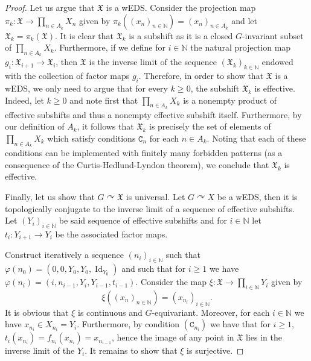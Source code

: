 \documentclass{article}
\theoremstyle{definition}
\theoremstyle{plain}
\newcommand{\NN}{\mathbb{N}}
\begin{document}
\begin{proof}
        Let us argue that $\mathfrak{X}$ is a wEDS. Consider the projection map $\pi_k \colon \mathfrak{X} \to \prod_{n\in A_k} X_n$ given by $\pi_k((x_n)_{n\in \NN}) = (x_n)_{n\in A_k}$ and let $\mathfrak{X}_k = \pi_k(\mathfrak{X})$. It is clear that $\mathfrak{X}_k$ is a subshift as it is a closed $G$-invariant subset of $\prod_{n\in A_k} X_k$. Furthermore, if we define for $i \in \NN$ the natural projection map $g_{i}\colon \mathfrak{X}_{i+1} \to \mathfrak{X}_i$, then $\mathfrak{X}$ is the inverse limit of the sequence $(\mathfrak{X}_k)_{k \in \NN}$ endowed with the collection of factor maps $g_{i}$. Therefore, in order to show that $\mathfrak{X}$ is a wEDS, we only need to argue that for every $k \geq 0$, the subshift $\mathfrak{X}_k$ is effective. 
        Indeed, let $k \geq 0$ and note first that $\prod_{n\in A_k}X_k$ is a nonempty product of effective subshifts and thus a nonempty effective subshift itself. Furthermore, by our definition of $A_k$, it follows that $\mathfrak{X}_k$ is precisely the set of elements of $\prod_{n\in A_k}X_k$ which satisfy conditions $\mathtt{C}_n$ for each $n \in A_k$. Noting that each of these conditions can be implemented with finitely many forbidden patterns (as a consequence of the Curtis-Hedlund-Lyndon theorem), we conclude that $\mathfrak{X}_k$ is effective. 

        Finally, let us show that $G\curvearrowright \mathfrak{X}$ is universal. Let $G\curvearrowright X$ be a wEDS, then it is topologically conjugate to the inverse limit of a sequence of effective subshifts. Let $(Y_i)_{i \in \NN}$ be said sequence of effective subshifts and for $i \in \NN$ let $t_{i}\colon Y_{i+1}\to Y_{i}$ be the associated factor maps.

        Construct iteratively a sequence $(n_i)_{i \in \NN}$ such that $\varphi(n_0) = (0,0,Y_0,Y_0,\operatorname{Id}_{Y_0})$ and such that for $i \geq 1$ we have $\varphi(n_i) = (i, n_{i-1},Y_i,Y_{i-1}, t_{i-1})$. Consider the map $\xi\colon \mathfrak{X}\to \prod_{i \in \NN} Y_i$ given by \[ \xi( (x_n)_{n \in \NN}) = (x_{n_i})_{i \in \NN}.   \]
        It is obvious that $\xi$ is continuous and $G$-equivariant. Moreover, for each $i \in \NN$ we have $x_{n_i}\in X_{n_i} = Y_i$. Furthermore, by condition $(\mathtt{C}_{n_i})$ we have that for $i \geq 1$, $t_i(x_{n_i})=f_{n_i}(x_{n_i})=x_{n_{i-1}}$, hence the image of any point in $\mathfrak{X}$ lies in the inverse limit of the $Y_i$. It remains to show that $\xi$ is surjective.


\end{proof}
\end{document}
